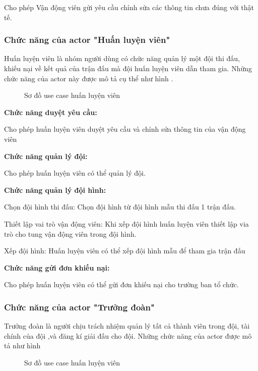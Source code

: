 Cho phép Vận động viên gửi yêu cầu chỉnh sửa các thông tin chưa đúng với thật tế.

\subsubsection{Chức năng của actor "Huấn luyện viên"}
Huấn luyện viên là nhóm người dùng có chức năng quản lý một đội thi đấu, khiếu nại về kết quả của trận đấu mà đội huấn luyện viên dẫn tham gia.
Những chức năng của actor này được mô tả cụ thể như hình
.

\begin{figure}[H]
  \centering
  
  \caption{Sơ đồ use case huấn luyện viên}
  \label{fig:uc-5}
\end{figure}

\noindent
\textbf{Chức năng duyệt yêu cầu:}

Cho phép huấn luyện viên duyệt yêu cầu và chỉnh sửa thông tin của vận động viên

\noindent
\textbf{Chức năng quản lý đội:}

Cho phép huấn luyện viên có thể quản lý đội.

\noindent
\textbf{Chức năng quản lý đội hình:}

Chọn đội hình thi đấu: Chọn đội hình từ đội hình mẫu thi đấu 1 trận đấu.\par
Thiết lập vai trò vận động viên: Khi xếp đội hình huấn luyện viên thiết lập via trò cho tung vận động viên trong đội hình.\par
Xếp đội hình: Huấn luyện viên có thể xếp đội hình mẫu để tham gia trận đấu


\noindent
\textbf{Chức năng gửi đơn khiếu nại:}

Cho phép huấn luyện viên có thể gửi đơn khiếu nại cho trường ban tổ chức.


\subsubsection{Chức năng của actor "Trưởng đoàn"}
Trưởng đoàn là người chịu trách nhiệm quản lý tất cả thành viên trong đội, tài chính của đội ,và đăng kí giải đấu cho đội.
Những chức năng của actor được mô tả như hình

\begin{figure}[H]
  \centering
  
  \caption{Sơ đồ use case huấn luyện viên}
  \label{fig:uc-6}
\end{figure}


